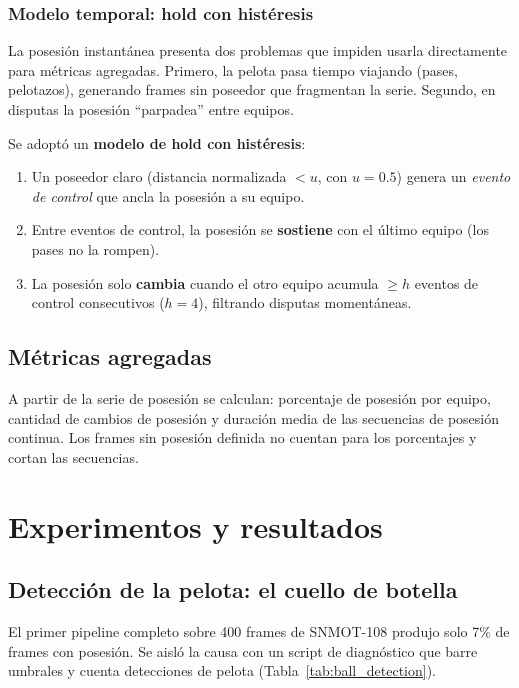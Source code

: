 \documentclass[conference]{IEEEtran}
\begin{document}
\subsubsection{Modelo temporal: hold con histéresis}

La posesión instantánea presenta dos problemas que impiden usarla
directamente para métricas agregadas. Primero, la pelota pasa tiempo
viajando (pases, pelotazos), generando frames sin poseedor que fragmentan
la serie. Segundo, en disputas la posesión ``parpadea'' entre equipos.

Se adoptó un \textbf{modelo de hold con histéresis}:

\begin{enumerate}
    \item Un poseedor claro (distancia normalizada $< u$, con $u = 0.5$)
    genera un \emph{evento de control} que ancla la posesión a su equipo.
    \item Entre eventos de control, la posesión se \textbf{sostiene} con el
    último equipo (los pases no la rompen).
    \item La posesión solo \textbf{cambia} cuando el otro equipo acumula
    $\geq h$ eventos de control consecutivos ($h = 4$), filtrando disputas
    momentáneas.
\end{enumerate}

\subsection{Métricas agregadas}

A partir de la serie de posesión se calculan: porcentaje de posesión por
equipo, cantidad de cambios de posesión y duración media de las secuencias
de posesión continua. Los frames sin posesión definida no cuentan para los
porcentajes y cortan las secuencias.

\section{Experimentos y resultados}
\label{sec:experimentos}

\subsection{Detección de la pelota: el cuello de botella}

El primer pipeline completo sobre 400 frames de SNMOT-108 produjo solo
7\% de frames con posesión. Se aisló la causa con un script de
diagnóstico que barre umbrales y cuenta detecciones de pelota
(Tabla~\ref{tab:ball_detection}).
\end{document}
